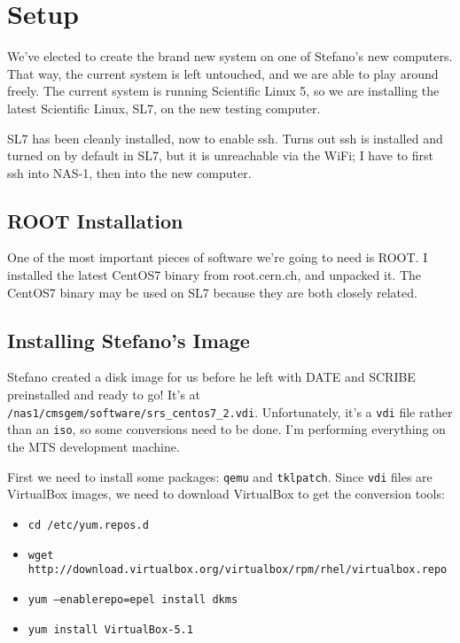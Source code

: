 \documentclass[12pt]{article}
\begin{document}

\section{Setup}

\qq We've elected to create the brand new system on one of Stefano's new
computers. That way, the current system is left untouched, and we are able to
play around freely. The current system is running Scientific Linux 5, so we are
installing the latest Scientific Linux, SL7, on the new testing computer. 

\qq SL7 has been cleanly installed, now to enable ssh. Turns out ssh is
installed and turned on by default in SL7, but it is unreachable via the WiFi; I
have to first ssh into NAS-1, then into the new computer.

\subsection{ROOT Installation}

\qq One of the most important pieces of software we're going to need is ROOT. I
installed the latest CentOS7 binary from root.cern.ch, and unpacked it. The
CentOS7 binary may be used on SL7 because they are both closely related. 

\subsection{Installing Stefano's Image}

\qq Stefano created a disk image for us before he left with DATE and SCRIBE
preinstalled and ready to go! It's at {\tt
  /nas1/cmsgem/software/srs\_centos7\_2.vdi}. Unfortunately, it's a {\tt vdi} file
rather than an {\tt iso}, so some conversions need to be done. I'm performing
everything on the MTS development machine.

\qq First we need to install some packages: {\tt qemu} and {\tt tklpatch}.
Since {\tt vdi} files are VirtualBox images, we need to download VirtualBox to
get the conversion tools:

\begin{itemize}
  \item {\tt cd /etc/yum.repos.d}
  \item {\tt wget
      http://download.virtualbox.org/virtualbox/rpm/rhel/virtualbox.repo}
  \item {\tt yum --enablerepo=epel install dkms}
  \item {\tt yum install VirtualBox-5.1}
\end{itemize}
\end{document}
